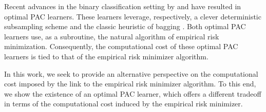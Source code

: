 Recent advances in the binary classification setting by \cite{hannekeoptimal} and \cite{baggingoptimalPAClearner} have resulted in optimal PAC learners. These learners leverage, respectively, a clever deterministic subsampling scheme and the classic heuristic of bagging \cite{Breiman1996BaggingP}. Both optimal PAC learners use, as a subroutine, the natural algorithm of empirical risk minimization. 
Consequently, the computational cost of these optimal PAC learners is tied to that of the empirical risk minimizer algorithm.

In this work, we seek to provide an alternative perspective on the computational cost imposed by the link to the empirical risk minimizer algorithm.
To this end, we show the existence of an optimal PAC learner, which offers a different tradeoff in terms of the computational cost induced by the empirical risk minimizer.